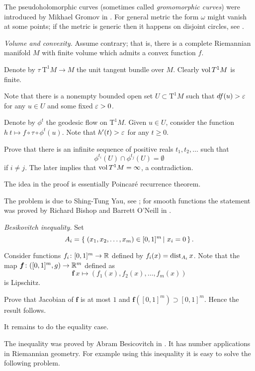  The pseudoholomorphic curves (sometimes called \emph{gromomorphic curves}) 
were introduced by Mikhael Gromov in \cite{gromov-pseudoholomorphic}.
For general metric the form $\omega$ might vanish at some points;
if the metric is generic then it happens on disjoint circles,
see \cite{honda}.







\textit{Volume and convexity.}
Assume contrary; that is, there is a complete Riemannian manifold $M$
with finite volume which admits a convex function $f$.

Denote by $\tau\:\mathrm{T}^1 M\to M$ the unit tangent bundle over $M$. 
Clearly $\operatorname{\rm vol} T^1M$ is finite.

Note that 
there is a nonempty bounded open set $U\subset \mathrm{T}^1 M$
such that $df(u)>\varepsilon$ for any $u\in U$ and some fixed $\varepsilon>0$.

Denote by $\phi^t$ the geodesic flow on $\mathrm{T}^1 M$.
Given $u\in U$,
consider the function $h\:t\mapsto f\circ\tau\circ\phi^t(u)$.
Note that $h'(t)>\varepsilon$ for any $t\ge 0$.

Prove that there is an infinite sequence of positive reals $t_1,t_2,\dots$
such that 
$$\phi^{t_i}(U)\cap\phi^{t_j}(U)=\emptyset$$ 
if $i\ne j$.
The later implies that $\operatorname{\rm vol} T^1M=\infty$,
a contradiction.

 The idea in the proof is essentially 
Poincar\'e recurrence theorem.

The problem is due to Shing-Tung Yau, see \cite{yau};
for smooth functions the statement was proved by Richard Bishop and Barrett O'Neill in \cite{bishop-o'neill}.


\textit{Besikovitch inequality.}
Set 
\[A_i=\set{(x_1,x_2,\dots,x_m)\in[0,1]^m}{x_i=0}.\]

Consider functions $f_i\colon[0,1]^m\to\mathbb{R}$ defined by
$f_i(x)=\operatorname{\rm dist}_{A_i}x$.
Note that 
the map $\bm{f}\colon([0,1]^m,g)\to\mathbb{R}^m$
defined as
\[\bm{f}\:x\mapsto(f_1(x),f_2(x),\dots,f_m(x))\]
is Lipschitz.

Prove that Jacobian of  $\bm{f}$
is at most $1$
and $\bm{f}([0,1]^m)\supset [0,1]^m$.
Hence the result follows.

It remains to do the equality case.

The inequality was proved by Abram Besicovitch in \cite{besicovitch}.
It has number applications in Riemannian geometry.
For example using this inequality it is easy to solve the following problem.

